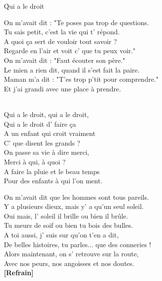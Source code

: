 \documentclass{novel}
\begin{document}
{\vspace{0.08\textheight}
\begin{minipage}[t][0.45\textheight][t]{\textwidth}
\h*{Qui a le droit}
\begin{multicols}{2}
\small

On m'avait dit : "Te poses pas trop de questions. \\
Tu sais petit, c'est la vie qui t' répond. \\
A quoi ça sert de vouloir tout savoir ? \\
Regarde en l'air et voit c' que tu peux voir." \\

On m'avait dit : "Faut écouter son père." \\
Le mien a rien dit, quand il s'est fait la paire. \\
Maman m'a dit : "T'es trop p'tit pour comprendre." \\
Et j'ai grandi avec une place à prendre. \\

\begin{bfseries}
[Refrain:]\\
Qui a le droit, qui a le droit, \\
Qui a le droit d' faire ça \\
A un enfant qui croit vraiment \\
C' que disent les grands ? \\

On passe sa vie à dire merci, \\
Merci à qui, à quoi ? \\
A faire la pluie et le beau temps \\
Pour des enfants à qui l'on ment. \\
\end{bfseries}

On m'avait dit que les hommes sont tous pareils. \\
Y a plusieurs dieux, mais y' a qu'un seul soleil. \\
Oui mais, l' soleil il brille ou bien il brûle. \\
Tu meurs de soif ou bien tu bois des bulles. \\

A toi aussi, j' suis sur qu'on t'en a dit, \\
De belles histoires, tu parles... que des conneries ! \\
Alors maintenant, on s' retrouve sur la route, \\
Avec nos peurs, nos angoisses et nos doutes. \\

\textbf{[Refrain]}\\

\end{multicols}
\end{minipage}
}
\end{document}
